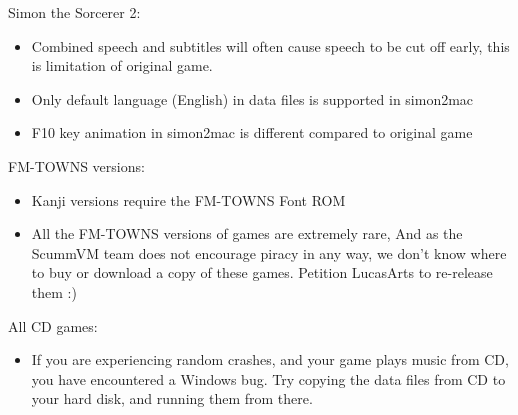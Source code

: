 Simon the Sorcerer 2:
  \begin{itemize}
  \item Combined speech and subtitles will often cause speech to be
                  cut off early, this is limitation of original game.
  \item Only default language (English) in data files is supported
                  in simon2mac
  \item F10 key animation in simon2mac is different compared to
                  original game
  \end{itemize}
FM-TOWNS versions:
  \begin{itemize}
  \item Kanji versions require the FM-TOWNS Font ROM
  \item All the FM-TOWNS versions of games are extremely rare,
                  And as the ScummVM team does not encourage piracy in any
                  way, we don't know where to buy or download a copy of these
                  games. Petition LucasArts to re-release them :)
  \end{itemize}
All CD games:
  \begin{itemize}
  \item If you are experiencing random crashes, and your game
                 plays music from CD, you have encountered a Windows bug.
                 Try copying the data files from CD to your hard disk, and
                 running them from there.
  \end{itemize}
